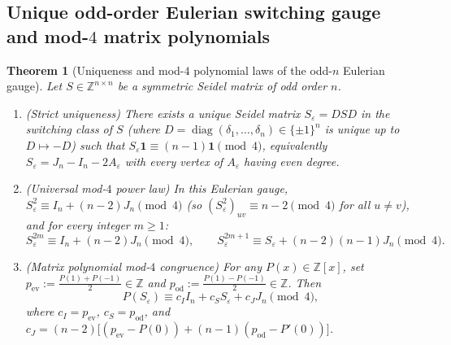 \documentclass[11pt,reqno]{amsart}
\newtheorem{theorem}{Theorem}[section]
\theoremstyle{definition}
\theoremstyle{remark}
\numberwithin{equation}{section}
\numberwithin{table}{section}
\DeclareMathOperator{\diag}{diag}
\begin{document}
\subsection{Unique odd-order Eulerian switching gauge and \texorpdfstring{mod-$4$}{mod-4} matrix polynomials}
\begin{theorem}[Uniqueness and mod-$4$ polynomial laws of the odd-$n$ Eulerian gauge]\label{thm:eulerian}
Let $S \in \mathbb{Z}^{n \times n}$ be a symmetric Seidel matrix of \emph{odd} order $n$.
\begin{enumerate}
  \item \emph{(Strict uniqueness)} There exists a \emph{unique} Seidel matrix $S_\varepsilon = D S D$ in the switching class of $S$ (where $D = \diag(\delta_1, \dots, \delta_n) \in \{\pm 1\}^n$ is unique up to $D \mapsto -D$) such that $S_\varepsilon \mathbf{1} \equiv (n - 1)\mathbf{1} \pmod 4$, equivalently $S_\varepsilon = J_n - I_n - 2A_\varepsilon$ with every vertex of $A_\varepsilon$ having even degree.
  \item \emph{(Universal mod-$4$ power law)} In this Eulerian gauge, $S_\varepsilon^2 \equiv I_n + (n - 2)J_n \pmod 4$ (so $(S_\varepsilon^2)_{uv} \equiv n - 2 \pmod 4$ for all $u \neq v$), and for every integer $m \ge 1$:
  \[
    S_\varepsilon^{2m} \equiv I_n + (n - 2)J_n \pmod{4}, \qquad S_\varepsilon^{2m+1} \equiv S_\varepsilon + (n - 2)(n - 1)J_n \pmod{4}.
  \]
  \item \emph{(Matrix polynomial mod-$4$ congruence)} For any $P(x) \in \mathbb{Z}[x]$, set $p_{\mathrm{ev}} := \frac{P(1) + P(-1)}{2} \in \mathbb{Z}$ and $p_{\mathrm{od}} := \frac{P(1) - P(-1)}{2} \in \mathbb{Z}$. Then
  \begin{equation}\label{eq:poly_mod4}
    P(S_\varepsilon) \equiv c_I I_n + c_S S_\varepsilon + c_J J_n \pmod{4},
  \end{equation}
  where $c_I = p_{\mathrm{ev}}$, $c_S = p_{\mathrm{od}}$, and $c_J = (n - 2)\big[(p_{\mathrm{ev}} - P(0)) + (n - 1)(p_{\mathrm{od}} - P'(0))\big]$.
\end{enumerate}
\end{theorem}
\end{document}
